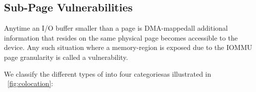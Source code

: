 



\subsection{Sub-Page Vulnerabilities}\label{sec:subpage}

Anytime an I/O buffer smaller than a page is DMA-mapped\DIFaddbegin \DIFadd{, }\DIFaddend all additional information that resides on the same physical page becomes accessible to the device. Any such situation where a memory-region is exposed due to the IOMMU page granularity is called a \subpage vulnerability.

We classify the different types of \subpage \DIFdelbegin {}\DIFdelend \DIFaddbegin {}\DIFaddend into four categories\DIFaddbegin \DIFadd{, }\DIFaddend as illustrated in \DIFdelbegin {}\DIFdelend \DIFaddbegin {}\DIFaddend ~\ref{fig:colocation}:

